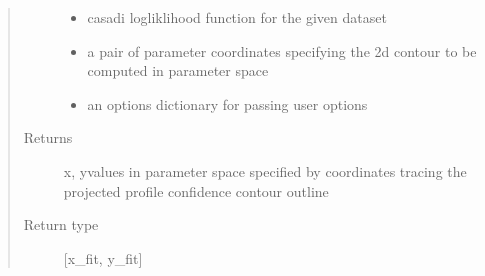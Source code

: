 \documentclass[letterpaper,10pt,english]{sphinxmanual}
\begin{document}
\begin{fulllineitems}
\begin{fulllineitems}
\begin{quote}
\begin{description}
\begin{itemize}
\item {} 
 \textendash{} casadi logliklihood function for the given dataset

\item {} 
 \textendash{} a pair of parameter coordinates specifying the 2d contour to be computed in parameter space

\item {} 
 \textendash{} an options dictionary for passing user options

\end{itemize}

\item[{Returns}] \leavevmode
x, y\sphinxhyphen{}values in parameter space specified by coordinates tracing the projected profile confidence contour outline

\item[{Return type}] \leavevmode
{[}x\_fit, y\_fit{]}

\end{description}\end{quote}

\end{fulllineitems}


\begin{fulllineitems}
\label{\detokenize{nloed:nloed.model.Model.__creategrid}}
\end{fulllineitems}



\end{fulllineitems}
\end{document}
